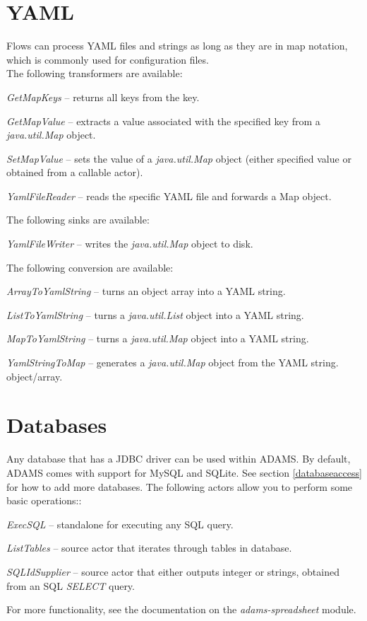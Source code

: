 \newpage
\section{YAML}
\label{yaml}
Flows can process YAML\cite{yaml} files and strings as long as they are in map notation,
which is commonly used for configuration files. \\
The following transformers are available:
\begin{tight_itemize}
	\item \textit{GetMapKeys} -- returns all keys from the key.
	\item \textit{GetMapValue} -- extracts a value associated with the
	specified key from a \textit{java.util.Map} object.
	\item \textit{SetMapValue} -- sets the value of a \textit{java.util.Map}
	object (either specified value or obtained from a callable actor).
	\item \textit{YamlFileReader} -- reads the specific YAML file and forwards
	a Map object.
\end{tight_itemize}
The following sinks are available:
\begin{tight_itemize}
	\item \textit{YamlFileWriter} -- writes the \textit{java.util.Map}
	object to disk.
\end{tight_itemize}
The following conversion are available:
\begin{tight_itemize}
	\item \textit{ArrayToYamlString} -- turns an object array into a YAML string.
	\item \textit{ListToYamlString} -- turns a \textit{java.util.List} object
	into a YAML string.
	\item \textit{MapToYamlString} -- turns a \textit{java.util.Map} object
	into a YAML string.
	\item \textit{YamlStringToMap} -- generates a \textit{java.util.Map}
	object from the YAML string.
	object/array.
\end{tight_itemize}


\newpage
\section{Databases}
Any database that has a JDBC driver can be used within ADAMS. By default,
ADAMS comes with support for MySQL and SQLite. See section \ref{databaseaccess} 
for how to add more databases. The following actors allow you to perform
some basic operations::
\begin{tight_itemize}
	\item \textit{ExecSQL} -- standalone for executing any SQL query.
	\item \textit{ListTables} -- source actor that iterates through tables
	in database.
	\item \textit{SQLIdSupplier} -- source actor that either outputs integer
	or strings, obtained from an SQL \textit{SELECT} query.
\end{tight_itemize}
For more functionality, see the documentation on the \textit{adams-spreadsheet} 
module.


